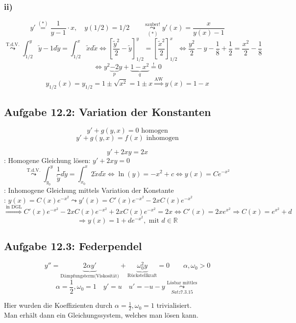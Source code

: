 \documentclass[
    accentcolor=pink,
    boxarc,
    dark_mode,
    logofile=enmpty
]{rubos-tuda-template}
\begin{document}
    \subsubsection*{ii)}
    \[y'\overset{(*)}{=}\frac{1}{y-1}\cdot x,\quad y(1/2)=1/2\qquad\overset{\text{sauber!}}{\underset{(*)}{\leadsto}}y'(x)=\frac{x}{y(x)-1}\]
    \[\overset{\text{T.d.V.}}{\leadsto}\int_{1/2}^{y}\tilde{y}-1d\tilde{y}=\int_{1/2}^{x}\tilde{x}d\tilde{x}\Leftrightarrow\left[\frac{\tilde{y}^2}{2}-\tilde{y}\right]^y_{1/2}=\left[\frac{\tilde{x}^2}{2}\right]^x_{1/2}\Leftrightarrow\frac{y^2}{2}-y-\frac{1}{8}+\frac{1}{2}=\frac{x^2}{2}-\frac{1}{8}\]
    \[\Leftrightarrow y^2\underbrace{-2}_py+\underbrace{1-x^2}_q\overset{!}{=}0\]
    \[y_{1/2}(x)=y_{1/2}=1\pm\sqrt{x^2}=1\pm x\overset{\text{AW}}{\Rightarrow}y(x)=1-x\]

    \subsection*{Aufgabe 12.2: Variation der Konstanten}
    \begin{anmerkungen}
        \[y'+g(y,x)=0\text{ homogen}\]
        \[y'+g(y,x)=f(x)\text{ inhomogen}\]
    \end{anmerkungen}
    \[y'+2xy=2x\]
    : Homogene Gleichung lösen: $y'+2xy=0$
    \[\overset{\text{T.d.V.}}{\leadsto}\int_{y_0}^{y}\frac{1}{\tilde y}d\tilde y=\int_{x_0}^{x}2\tilde xd \tilde x\Leftrightarrow\ln(y)=-x^2+c\Leftrightarrow y(x)=Ce^{-x^2}\]
    : Inhomogene Gleichung mittels Variation der Konstante\\
    : $y(x)=C(x)e^{-x^2}\leadsto y'(x)= C'(x)e^{-x^2}-2xC(x)e^{-x^2}$
    \[\overset{\text{in DGL}}{\Rightarrow}C'(x)e^{-x^2}-2xC(x)e^{-x^2}+2xC(x)e^{-x^2}=2x\Leftrightarrow C'(x)=2xe^{x^2}\Rightarrow C(x)=e^{x^2}+d\]
    \[\Rightarrow y(x)=1+de^{-x^2},\text{ mit }d\in\mathbb{R}\]

    \subsection*{Aufgabe 12.3: Federpendel}
    \[y''=\underbrace{2\alpha y'}_{\text{Dämpfungsterm(Viskosität)}}+\underbrace{\omega^2_0y}_{\text{Rückstellkraft}}=0\qquad\alpha,\omega_0>0\]
    \[\alpha=\frac{1}{2},\omega_0=1\quad y'=u \quad u'=-u-y \overset{\text{Lösbar mittles}}{\underset{Satz 7.3.15}{\leadsto}}\]
    \begin{anmerkungen}
        Hier wurden die Koeffizienten durch $\alpha=\frac{1}{2},\omega_0=1$ trivialisiert.\\
        Man erhält dann ein Gleichungssystem, welches man lösen kann.
    \end{anmerkungen}
\end{document}
